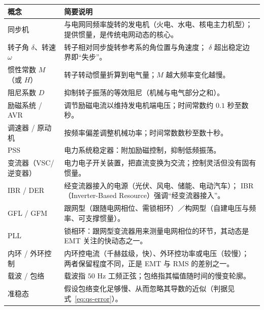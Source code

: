 \begin{table}[H]
\centering
\small
\renewcommand{\arraystretch}{1.12}
\begin{tabularx}{\textwidth}{@{}lX@{}}
\toprule
概念 & 简要说明 \\
\midrule
同步机 & 与电网同频率旋转的发电机（火电、水电、核电主力机型）；
提供惯量，是传统电网动态的核心。 \\
转子角 $\delta$、转速 $\omega$ & 转子相对同步旋转参考系的角位置与角速度；
$\delta$ 超出稳定边界即“失步”。 \\
惯性常数 $M$（或 $H$） & 转子转动惯量折算到电气量；$M$ 越大频率变化越慢。 \\
阻尼系数 $D$ & 抑制转子振荡的等效阻尼（机械与电气部分之和）。 \\
励磁系统 / AVR & 调节励磁电流以维持发电机端电压；时间常数约 $0.1$ 秒至数秒。 \\
调速器 / 原动机 & 按频率偏差调整机械功率；时间常数数秒至数十秒。 \\
PSS & 电力系统稳定器：附加励磁控制，抑制低频振荡。 \\
变流器（VSC/逆变器） & 电力电子开关装置，把直流变换为交流；控制灵活但没有固有惯量。 \\
IBR / DER & 经变流器接入的电源（光伏、风电、储能、电动汽车）；
IBR（Inverter-Based Resource）强调“经变流器接入”。 \\
GFL / GFM & 跟网型（跟随电网相位、需锁相环）／构网型（自建电压与频率、可支撑惯量）。 \\
PLL & 锁相环：跟网型变流器用来测量电网相位的环节，其动态是 EMT 关注的快动态之一。 \\
内环 / 外环控制 & 内环控电流（千赫兹级，快）、外环控功率或电压（较慢）；
两者保留程度不同，正是 EMT 与 RMS 的差别之一。 \\
载波 / 包络 & 载波指 $50$ Hz 工频正弦；包络指其幅值随时间的慢变轮廓。 \\
准稳态 & 假设包络变化足够慢、从而忽略其导数的近似（判据见式~\eqref{eq:qs-error}）。 \\
\bottomrule
\end{tabularx}
\end{table}
